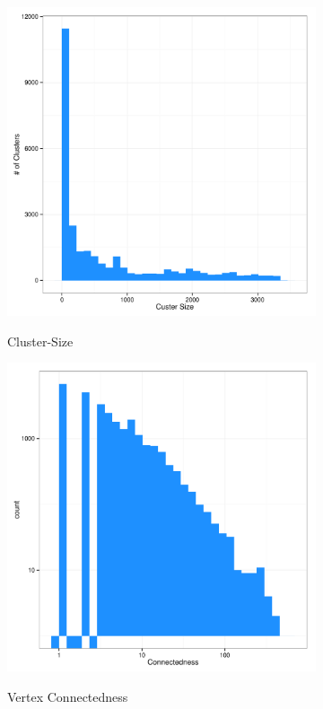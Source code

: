 \begin{figure}
  \centering
  \begin{subfigure}[b]{0.49\textwidth}
    \caption{Cluster-Size}
    \includegraphics[width=\textwidth]{wiki_cl_hist.pdf}
    \label{fig:wiki_size}
  \end{subfigure}
  \hfill
  \begin{subfigure}[b]{0.49\textwidth}
    \caption{Vertex Connectedness}
    \includegraphics[width=\textwidth]{wiki_edge_hist.pdf}
    \label{fig:wiki_conn}
  \end{subfigure}
  \caption{}
\end{figure}

